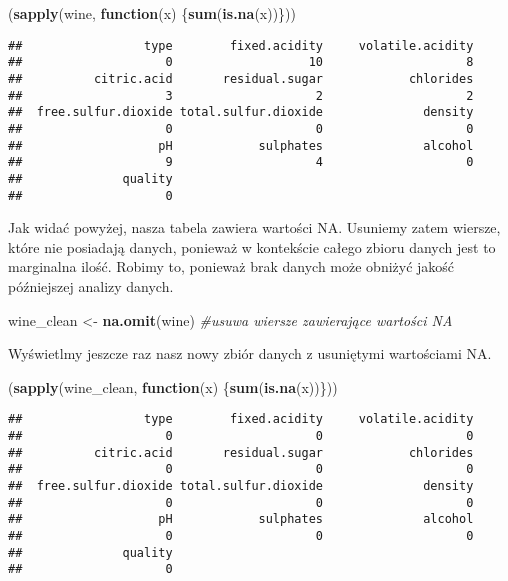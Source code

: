 \documentclass[
]{article}
\newenvironment{Shaded}{\begin{snugshade}}{\end{snugshade}}
\newcommand{\CommentTok}[1]{\textcolor[rgb]{0.56,0.35,0.01}{\textit{#1}}}
\newcommand{\ControlFlowTok}[1]{\textcolor[rgb]{0.13,0.29,0.53}{\textbf{#1}}}
\newcommand{\FunctionTok}[1]{\textcolor[rgb]{0.13,0.29,0.53}{\textbf{#1}}}
\newcommand{\NormalTok}[1]{#1}
\newcommand{\OtherTok}[1]{\textcolor[rgb]{0.56,0.35,0.01}{#1}}
\begin{document}
\begin{Shaded}
\begin{Highlighting}[]
\NormalTok{(}\FunctionTok{sapply}\NormalTok{(wine, }\ControlFlowTok{function}\NormalTok{(x) \{}\FunctionTok{sum}\NormalTok{(}\FunctionTok{is.na}\NormalTok{(x))\}))}
\end{Highlighting}
\end{Shaded}

\begin{verbatim}
##                 type        fixed.acidity     volatile.acidity 
##                    0                   10                    8 
##          citric.acid       residual.sugar            chlorides 
##                    3                    2                    2 
##  free.sulfur.dioxide total.sulfur.dioxide              density 
##                    0                    0                    0 
##                   pH            sulphates              alcohol 
##                    9                    4                    0 
##              quality 
##                    0
\end{verbatim}

Jak widać powyżej, nasza tabela zawiera wartości NA. Usuniemy zatem
wiersze, które nie posiadają danych, ponieważ w kontekście całego zbioru
danych jest to marginalna ilość. Robimy to, ponieważ brak danych może
obniżyć jakość późniejszej analizy danych.

\begin{Shaded}
\begin{Highlighting}[]
\NormalTok{wine\_clean }\OtherTok{\textless{}{-}} \FunctionTok{na.omit}\NormalTok{(wine) }\CommentTok{\#usuwa wiersze zawierające wartości NA}
\end{Highlighting}
\end{Shaded}

Wyświetlmy jeszcze raz nasz nowy zbiór danych z usuniętymi wartościami
NA.

\begin{Shaded}
\begin{Highlighting}[]
\NormalTok{(}\FunctionTok{sapply}\NormalTok{(wine\_clean, }\ControlFlowTok{function}\NormalTok{(x) \{}\FunctionTok{sum}\NormalTok{(}\FunctionTok{is.na}\NormalTok{(x))\}))}
\end{Highlighting}
\end{Shaded}

\begin{verbatim}
##                 type        fixed.acidity     volatile.acidity 
##                    0                    0                    0 
##          citric.acid       residual.sugar            chlorides 
##                    0                    0                    0 
##  free.sulfur.dioxide total.sulfur.dioxide              density 
##                    0                    0                    0 
##                   pH            sulphates              alcohol 
##                    0                    0                    0 
##              quality 
##                    0
\end{verbatim}
\end{document}
